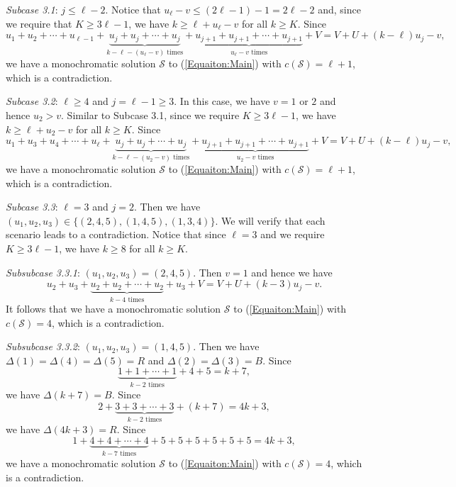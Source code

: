 \documentclass[11pt]{article}
\theoremstyle{definition}
\begin{document}
\textit{Subcase 3.1}: $j\leq\ell-2$. Notice that $u_\ell-v\leq (2\ell-1)-1=2\ell-2$ and, since we require that $K\geq3\ell-1$, we have $k\geq\ell+u_\ell-v$ for all $k\geq K$. Since
\[
u_1+u_2+\cdots+u_{\ell-1}+\underbrace{u_j+u_j+\cdots+u_j}_{k-\ell-(u_{\ell}-v)\text{ times}}+\underbrace{u_{j+1}+u_{j+1}+\cdots+u_{j+1}}_{u_{\ell}-v\text{ times}}+V=V+U+(k-\ell)u_j-v,
\]
we have a monochromatic solution $\mathcal{S}$ to (\ref{Equaiton:Main}) with $c(\mathcal{S})=\ell+1$, which is a contradiction.

\textit{Subcase 3.2}: $\ell\geq4$ and $j=\ell-1\geq3$. In this case, we have $v=1$ or $2$ and hence $u_2>v$. Similar to Subcase 3.1, since we require $K\geq3\ell-1$, we have $k\geq\ell+u_2-v$ for all $k\geq K$. Since 
\[
u_1+u_3+u_4+\cdots+u_{\ell}+\underbrace{u_j+u_j+\cdots+u_j}_{k-\ell-(u_{2}-v)\text{ times}}+\underbrace{u_{j+1}+u_{j+1}+\cdots+u_{j+1}}_{u_{2}-v\text{ times}}+V=V+U+(k-\ell)u_j-v,
\]
we have a monochromatic solution $\mathcal{S}$ to (\ref{Equaiton:Main}) with $c(\mathcal{S})=\ell+1$, which is a contradiction.

\textit{Subcase 3.3}: $\ell=3$ and $j=2$. Then we have $(u_1,u_2,u_3)\in\{(2,4,5),(1,4,5),(1,3,4)\}$. We will verify that each scenario leads to a contradiction. Notice that since $\ell=3$ and we require $K\geq3\ell-1$, we have $k\geq8$ for all $k\geq K$.

\textsl{Subsubcase 3.3.1}: $(u_1,u_2,u_3)=(2,4,5)$. Then $v=1$ and hence we have
\[
u_2+u_3+\underbrace{u_2+u_2+\cdots+u_2}_{k-4\text{ times}}+u_3+V=V+U+(k-3)u_j-v.
\]
It follows that we have a monochromatic solution $\mathcal{S}$ to (\ref{Equaiton:Main}) with $c(\mathcal{S})=4$, which is a contradiction.

\textsl{Subsubcase 3.3.2}: $(u_1,u_2,u_3)=(1,4,5)$. Then we have $\Delta(1)=\Delta(4)=\Delta(5)=R$ and $\Delta(2)=\Delta(3)=B$. Since
\[
\underbrace{1+1+\cdots+1}_{k-2\text{ times}}+4+5=k+7,
\]
we have $\Delta(k+7)=B$. Since
\[
2+\underbrace{3+3+\cdots+3}_{k-2\text{ times}}+(k+7)=4k+3,
\]
we have $\Delta(4k+3)=R$. Since 
\[
1+\underbrace{4+4+\cdots+4}_{k-7\text{ times}}+5+5+5+5+5+5=4k+3,
\]
we have a monochromatic solution $\mathcal{S}$ to (\ref{Equaiton:Main}) with $c(\mathcal{S})=4$, which is a contradiction.
\end{document}
